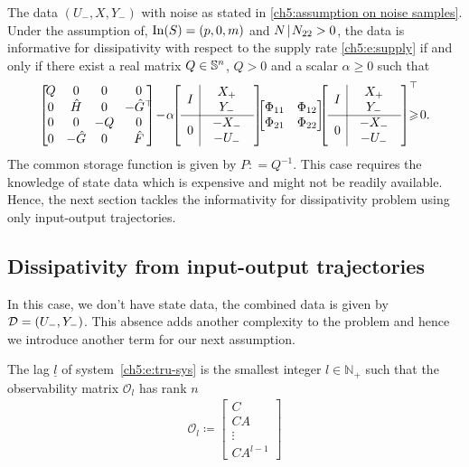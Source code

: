 The data $(U_-,X,Y_-)$ with noise as stated in \ref{ch5:assumption on noise samples}. Under the assumption of, $\In(S) = (p,0,m)$ and $N \schur N_{22} >0$,
the data is informative for dissipativity with respect to the supply rate \eqref{ch5:e:supply} if and only if there exist a real matrix $Q \in \S{n}$, $Q >0$ and a scalar $\alpha\geq 0$ such that 
\begin{equation}
\begin{bmatrix}
    \! Q & \!0\! & \!0\! & 0 \!\!\! \\
    \! 0 & \!\hatH\! & \!0\! &-\hatG^\top \!\!\! \\
   \! 0 & \!0\! & \!-Q\! & 0 \!\!\! \\
   \! 0 & \!-\hatG\! & \!0\! & \hatF \!\!\!
    \end{bmatrix} \!-\! \alpha\!\!
    \None
     \!\!\!\!\geq\! 0. \label{ch5:eq:LMI2}
\end{equation}
The common storage function is given by $P : = Q^{-1}$.
\ethe
This case requires the knowledge of state data which is expensive and might not be readily available. Hence, the next section tackles the informativity for dissipativity problem using only input-output trajectories.
\subsection{Dissipativity from input-output trajectories}
In this case, we don't have state data, the combined data is given by $\calD = (U_-,Y_-)$. This absence adds another complexity to the problem and hence we introduce another term for our next assumption.
\begin{definition}[\cite{9551767}]
    The lag $\underline{l}$ of system~\eqref{ch5:e:tru-sys} is the smallest integer $l \in \mathbb{N}_{+}$ such that the observability matrix $\mathcal{O}_l$ has rank $n$
    \begin{align}
    \mathcal{O}_l \coloneqq \begin{bmatrix} C \\ CA \\ \vdots \\ CA^{l-1}
    \end{bmatrix}
    \end{align}
    \label{def:lag}
\end{definition}
